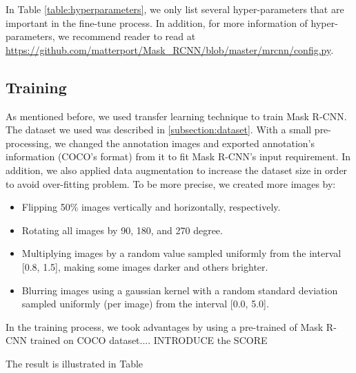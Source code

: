 	In Table \ref{table:hyperparameters}, we only list several hyper-parameters that are important in the fine-tune process. In addition, for more information of hyper-parameters, we recommend reader to read at \url{https://github.com/matterport/Mask_RCNN/blob/master/mrcnn/config.py}.
	
\subsection{Training}
\noindent

	As mentioned before, we used transfer learning technique to train Mask R-CNN. The dataset we used was described in \ref{subsection:dataset}. With a small pre-processing, we changed the annotation images and exported annotation's information (COCO's format) from it to fit Mask R-CNN's input requirement. In addition, we also applied data augmentation to increase the dataset size in order to avoid over-fitting problem. To be more precise, we created more images by:
	
	\begin{itemize}
		\item Flipping 50\% images vertically and horizontally, respectively.
		\item Rotating all images by 90, 180, and 270 degree.
		\item Multiplying images by a random value sampled uniformly from the interval [0.8, 1.5], making some images darker and others brighter.
		\item Blurring images using a gaussian kernel with a random standard deviation sampled uniformly (per image) from the interval [0.0, 5.0].
	\end{itemize}
	
	In the training process, we took advantages by using a pre-trained of Mask R-CNN trained on COCO dataset.... INTRODUCE the SCORE
	
	
	The result is illustrated in Table 
	
